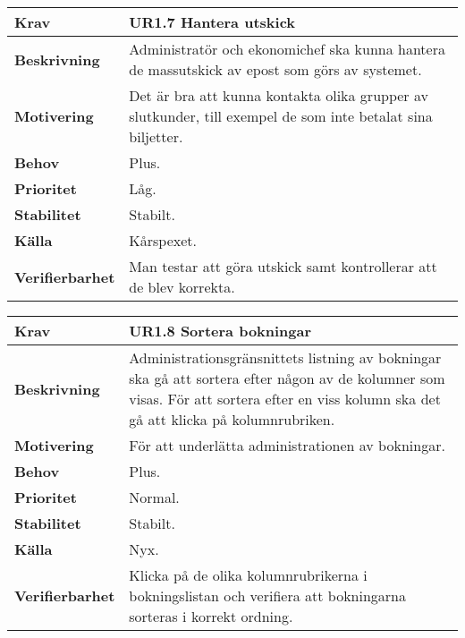 \documentclass[a4paper, twoside, 11pt, titlepage]{article}
\begin{document}
		\begin{tabular} { p{2.6cm} p{12.5cm} }
			\hline
			\sffamily\textbf{Krav} & \sffamily\textbf{UR1.7 Hantera utskick  } \\
			\hline
			\sffamily\textbf{Beskrivning} & Administratör och ekonomichef ska kunna hantera de massutskick av epost som görs av systemet.  \\
			\hline
			\sffamily\textbf{Motivering} & Det är bra att kunna kontakta olika grupper av slutkunder, till exempel de som inte betalat sina biljetter.  \\
			\hline
			\sffamily\textbf{Behov} & Plus.  \\
			\hline
			\sffamily\textbf{Prioritet} & Låg.  \\
			\hline
			\sffamily\textbf{Stabilitet} & Stabilt.  \\
			\hline
			\sffamily\textbf{Källa} & Kårspexet.  \\
			\hline
			\sffamily\textbf{Verifierbarhet} & Man testar att göra utskick samt kontrollerar att de blev korrekta.  \\
			\hline
		\end{tabular}
		\vspace{6mm}

		\begin{tabular} { p{2.6cm} p{12.5cm} }
			\hline
			\sffamily\textbf{Krav} & \sffamily\textbf{UR1.8 Sortera bokningar  } \\
			\hline
			\sffamily\textbf{Beskrivning} & Administrationsgränsnittets listning av bokningar ska gå att sortera efter någon av de kolumner som visas. För att sortera efter en viss kolumn ska det gå att klicka på kolumnrubriken.  \\
			\hline
			\sffamily\textbf{Motivering} & För att underlätta administrationen av bokningar.  \\
			\hline
			\sffamily\textbf{Behov} & Plus.  \\
			\hline
			\sffamily\textbf{Prioritet} & Normal.  \\
			\hline
			\sffamily\textbf{Stabilitet} & Stabilt.  \\
			\hline
			\sffamily\textbf{Källa} & Nyx.  \\
			\hline
			\sffamily\textbf{Verifierbarhet} & Klicka på de olika kolumnrubrikerna i bokningslistan och verifiera att bokningarna sorteras i korrekt ordning.  \\
			\hline
		\end{tabular}
		\vspace{6mm}
\end{document}
